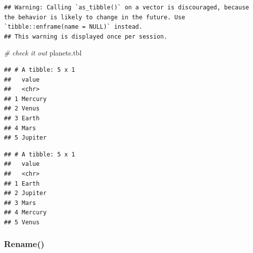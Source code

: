 \documentclass[
]{article}
\newenvironment{Shaded}{\begin{snugshade}}{\end{snugshade}}
\newcommand{\CommentTok}[1]{\textcolor[rgb]{0.56,0.35,0.01}{\textit{#1}}}
\newcommand{\KeywordTok}[1]{\textcolor[rgb]{0.13,0.29,0.53}{\textbf{#1}}}
\newcommand{\NormalTok}[1]{#1}
\newcommand{\OperatorTok}[1]{\textcolor[rgb]{0.81,0.36,0.00}{\textbf{#1}}}
\newcommand{\StringTok}[1]{\textcolor[rgb]{0.31,0.60,0.02}{#1}}
\begin{document}
\begin{Shaded}
\end{Shaded}

\begin{verbatim}
## Warning: Calling `as_tibble()` on a vector is discouraged, because the behavior is likely to change in the future. Use `tibble::enframe(name = NULL)` instead.
## This warning is displayed once per session.
\end{verbatim}

\begin{Shaded}
\begin{Highlighting}[]
\CommentTok{# check it out}
\NormalTok{planets.tbl}
\end{Highlighting}
\end{Shaded}

\begin{verbatim}
## # A tibble: 5 x 1
##   value  
##   <chr>  
## 1 Mercury
## 2 Venus  
## 3 Earth  
## 4 Mars   
## 5 Jupiter
\end{verbatim}

\begin{Shaded}
\end{Shaded}

\begin{verbatim}
## # A tibble: 5 x 1
##   value  
##   <chr>  
## 1 Earth  
## 2 Jupiter
## 3 Mars   
## 4 Mercury
## 5 Venus
\end{verbatim}

\hypertarget{rename}{%
\subsubsection{Rename()}\label{rename}}
\end{document}
